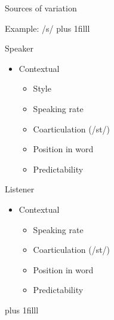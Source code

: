 \documentclass{beamer}
\newcommand{\btVFill}{\vskip0pt plus 1filll}
\begin{document}
\begin{frame}{Sources of variation}

Example: /s/
\btVFill
\begin{minipage}[t]{0.45\textwidth}
Speaker

\begin{itemize}
\item Contextual
\begin{itemize}
\item Style
\item Speaking rate
\item Coarticulation (/st\textturnr/)
\item Position in word
\item Predictability
\end{itemize}

\end{itemize}
\end{minipage}
\hfill
\begin{minipage}[t]{0.45\textwidth}
Listener

\begin{itemize}
\item Contextual
\begin{itemize}
\item Speaking rate
\item Coarticulation (/st\textturnr/)
\item Position in word
\item Predictability
\end{itemize}
\end{itemize}
\end{minipage}
\btVFill
\begin{flushright}
\scriptsize
\citet{Lieberman1963,Kraljic2008a,Clopper2008, Pitt2012}
\end{flushright}
\end{frame}
\end{document}
